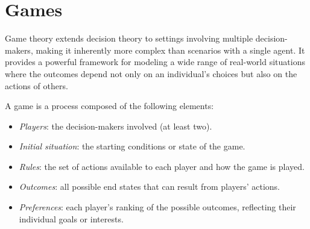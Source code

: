 \section{Games}

Game theory extends decision theory to settings involving multiple decision-makers, making it inherently more complex than scenarios with a single agent. 
It provides a powerful framework for modeling a wide range of real-world situations where the outcomes depend not only on an individual's choices but also on the actions of others.

\begin{definition}
    A game is a process composed of the following elements:
    \begin{itemize}
        \item \textit{Players}: the decision-makers involved (at least two).
        \item \textit{Initial situation}: the starting conditions or state of the game.
        \item \textit{Rules}: the set of actions available to each player and how the game is played.
        \item \textit{Outcomes}: all possible end states that can result from players' actions.
        \item \textit{Preferences}: each player's ranking of the possible outcomes, reflecting their individual goals or interests.
    \end{itemize}
\end{definition}